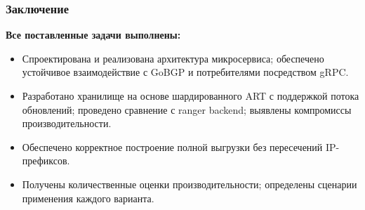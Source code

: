 \begin{frame}\frametitle{Заключение}
\textbf{Все поставленные задачи выполнены:}
\begin{itemize}\setlength{\itemsep}{0.25em}
  \item Спроектирована и реализована архитектура микросервиса; обеспечено устойчивое взаимодействие с GoBGP и потребителями посредством gRPC.
  \item Разработано хранилище на основе шардированного ART с поддержкой потока обновлений; проведено сравнение с ranger backend; выявлены компромиссы производительности.
  \item Обеспечено корректное построение полной выгрузки без пересечений IP-префиксов.
  \item Получены количественные оценки производительности; определены сценарии применения каждого варианта.
\end{itemize}
\end{frame}
